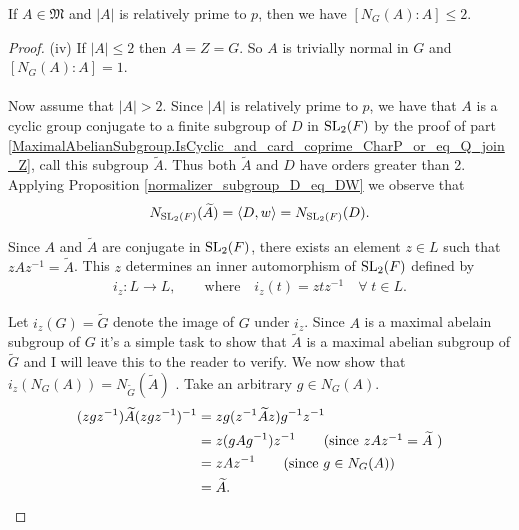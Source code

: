 \begin{theorem}
  \label{MaximalAbelianSubgroup.index_normalizer_le_two}
  \leanok
If $A \in \mathfrak{M}$ and $|A|$ is relatively prime to $p$, then we have $[N_G(A): A] \leq 2$. 
\end{theorem}
\begin{proof}
  (iv) If $|A| \leq 2$ then $A=Z=G$. So $A$ is trivially normal in $G$ and $[N_G(A): A] = 1$. \\
  \\
  Now assume that $|A| > 2$. Since $|A|$ is relatively prime to $p$, we have that $A$ is a cyclic group conjugate to a finite subgroup of $D$ in $\operatorname{SL}_2(F)$ by the proof of part \ref{MaximalAbelianSubgroup.IsCyclic_and_card_coprime_CharP_or_eq_Q_join_Z}, call this subgroup ${\widetilde{A}}$. Thus both ${\widetilde{A}}$ and $D$ have orders greater than 2. Applying Proposition \ref{normalizer_subgroup_D_eq_DW} we observe that
  \begin{align}\label{norm1}  N_{\operatorname{SL}_2(F)}({\widetilde{A}}) = \langle D , w \rangle = N_{\operatorname{SL}_2(F)}(D).
  \end{align}
  
  Since $A$ and ${\widetilde{A}}$ are conjugate in $\operatorname{SL}_2(F)$, there exists an element $z \in L$ such that $zAz^{-1} = {\widetilde{A}}$. This $z$ determines an inner automorphism of $\operatorname{SL}_2(F)$ defined by
  \begin{align*} 
      i_z: L \longrightarrow L,  \qquad \text{where} \quad  i_z(t) = z t z^{-1}  \quad \forall \; t \in L.
  \end{align*}
  
  Let $i_z(G) = {\widetilde{G}}$ denote the image of $G$ under $i_z$. Since $A$ is a maximal abelain subgroup of $G$ it's a simple task to show that ${\widetilde{A}}$ is a maximal abelian subgroup of ${\widetilde{G}}$ and I will leave this to the reader to verify. We now show that $i_z(N_G(A)) = N_{\widetilde{G}}({\widetilde{A}})$ . Take an arbitrary $g \in N_G(A)$.
  \begin{align*} (z g z^{-1}) {\widetilde{A}} (z g z^{-1})^{-1} &= z g (z^{-1} {\widetilde{A}} z) g^{-1} z^{-1}
  \\ &=  z (g A g^{-1}) z^{-1} \tag{since $zAz^{-1} = {\widetilde{A}}$ }
  \\ &= z A z^{-1} \tag{since $g \in N_G(A)$}
  \\ &= {\widetilde{A}}.
  \end{align*}
  

\end{proof}
